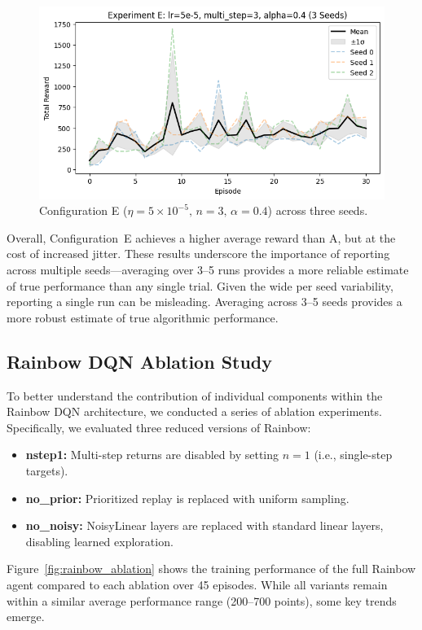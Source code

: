\documentclass{article}
\begin{document}
\begin{figure}[ht]
  \centering
  \includegraphics[width=0.8\linewidth]{rainbow_E_seed.png}
  \caption{Configuration E (\(\eta=5\times10^{-5},\,n=3,\,\alpha=0.4\)) across three seeds.}
  \label{fig:seed_E}
\end{figure}

Overall, Configuration E achieves a higher average reward than A, but at the cost of increased jitter. These results underscore the importance of reporting across multiple seeds—averaging over 3–5 runs provides a more reliable estimate of true performance than any single trial. Given the wide per seed variability, reporting a single run can be misleading. Averaging across 3–5 seeds provides a more robust estimate of true algorithmic performance.


\subsection{Rainbow DQN Ablation Study}

To better understand the contribution of individual components within the Rainbow DQN architecture, we conducted a series of ablation experiments. Specifically, we evaluated three reduced versions of Rainbow:
\begin{itemize}
    \item \textbf{nstep1:} Multi-step returns are disabled by setting $n=1$ (i.e., single-step targets).
    \item \textbf{no\_prior:} Prioritized replay is replaced with uniform sampling.
    \item \textbf{no\_noisy:} NoisyLinear layers are replaced with standard linear layers, disabling learned exploration.
\end{itemize}

Figure~\ref{fig:rainbow_ablation} shows the training performance of the full Rainbow agent compared to each ablation over 45 episodes. While all variants remain within a similar average performance range (200–700 points), some key trends emerge.
\end{document}
